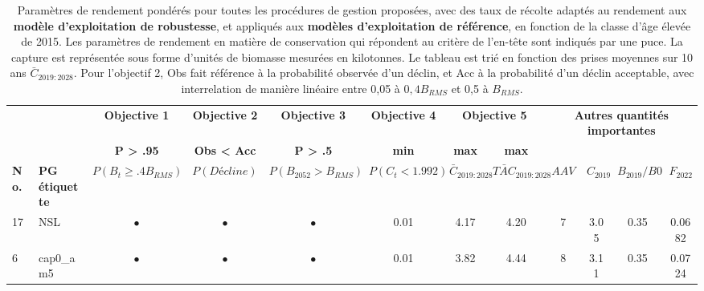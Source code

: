 \documentclass[11pt]{book}
\begin{document}
\begin{turn}
\begingroup\fontsize{7}{9}\selectfont
\begingroup\fontsize{7}{9}\selectfont
\begin{longtable}[t]{llcccccccccc}
\caption{\label{tab:unnamed-chunk-15}Paramètres de rendement pondérés pour toutes les procédures de gestion proposées, avec des taux de récolte adaptés au rendement aux \textbf{modèle d’exploitation de robustesse}, et appliqués aux \textbf{modèles d’exploitation de référence}, en fonction de la classe d’âge élevée de 2015. Les paramètres de rendement en matière de conservation qui répondent au critère de l’en-tête sont indiqués par une puce. La capture est représentée sous forme d’unités de biomasse mesurées en kilotonnes. Le tableau est trié en fonction des prises moyennes sur 10 ans $\bar{C}_{2019:2028}$. Pour l’objectif 2, Obs fait référence à la probabilité observée d’un déclin, et Acc à la probabilité d’un déclin acceptable, avec interrelation de manière linéaire entre 0,05 à $0,4B_{RMS}$ et 0,5 à $B_{RMS}$.}\\
\toprule
\multicolumn{2}{c}{\textbf{ }} & \multicolumn{1}{c}{\textbf{Objective 1}} & \multicolumn{1}{c}{\textbf{Objective 2}} & \multicolumn{1}{c}{\textbf{Objective 3}} & \multicolumn{1}{c}{\textbf{Objective 4}} & \multicolumn{2}{c}{\textbf{Objective 5}} & \multicolumn{4}{c}{\textbf{Autres quantités importantes}} \\
\cmidrule(l{3pt}r{3pt}){3-3} \cmidrule(l{3pt}r{3pt}){4-4} \cmidrule(l{3pt}r{3pt}){5-5} \cmidrule(l{3pt}r{3pt}){6-6} \cmidrule(l{3pt}r{3pt}){7-8} \cmidrule(l{3pt}r{3pt}){9-12}
\multicolumn{2}{c}{\textbf{ }} & \multicolumn{1}{c}{\textbf{P > .95}} & \multicolumn{1}{c}{\textbf{Obs < Acc}} & \multicolumn{1}{c}{\textbf{P > .5}} & \multicolumn{1}{c}{\textbf{min}} & \multicolumn{1}{c}{\textbf{max}} & \multicolumn{1}{c}{\textbf{max}} & \multicolumn{4}{c}{\textbf{ }} \\
\cmidrule(l{3pt}r{3pt}){3-3} \cmidrule(l{3pt}r{3pt}){4-4} \cmidrule(l{3pt}r{3pt}){5-5} \cmidrule(l{3pt}r{3pt}){6-6} \cmidrule(l{3pt}r{3pt}){7-7} \cmidrule(l{3pt}r{3pt}){8-8}
\textbf{No.} & \textbf{PG étiquette} & \textbf{$P(B_t \geq .4B_{RMS})$} & \textbf{$P(Décline)$} & \textbf{$P(B_{2052} > B_{RMS})$} & \textbf{$P(C_t < 1.992)$} & \textbf{$\bar{C}_{2019:2028}$} & \textbf{$\bar{TAC}_{2019:2028}$} & \textbf{$AAV$} & \textbf{$C_{2019}$} & \textbf{$B_{2019}/B0$} & \textbf{$F_{2022}$}\\
\midrule
17 & NSL & $\bullet$ & $\bullet$ & $\bullet$ & 0.01 & 4.17 & 4.20 & 7 & 3.05 & 0.35 & 0.0682\\
6 & cap0\_am5 & $\bullet$ & $\bullet$ & $\bullet$ & 0.01 & 3.82 & 4.44 & 8 & 3.11 & 0.35 & 0.0724\\

\end{longtable}
\end{turn}
\end{document}
